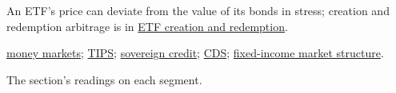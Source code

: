 \begin{qfdefinition}
 An ETF's price can deviate from the value of its bonds in stress; creation and redemption arbitrage is in \hyperref[mech:etf-creation-redemption]{ETF creation and redemption}.

 \hyperref[def:money-market-reference-rates]{money markets}; \hyperref[def:tips-breakevens]{TIPS}; \hyperref[def:sovereign-credit-defaults]{sovereign credit}; \hyperref[mech:cds-contract-credit-events]{CDS}; \hyperref[def:fixed-income-market-structure]{fixed-income market structure}.

 The section's readings on each segment.

\end{qfdefinition}

